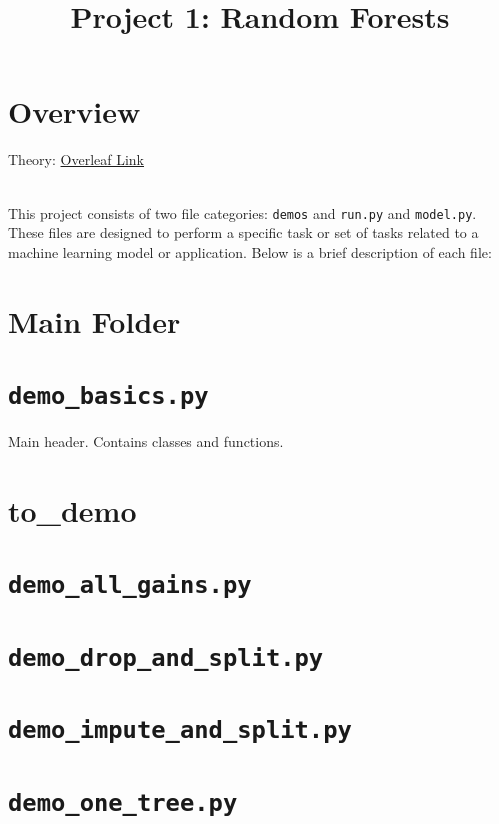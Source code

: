 \documentclass{article}
\begin{document}
\title{Project 1: Random Forests}
\author{}
\date{}
\maketitle

\section*{Overview}


Theory: \href{https://www.overleaf.com/project/65e797a9e7782c058ef218cc}{Overleaf Link}

\\
This project consists of two file categories: \texttt{demos} and \texttt{\texttt{run.py}} and \texttt{model.py}. These files are designed to perform a specific task or set of tasks related to a machine learning model or application. Below is a brief description of each file:


\section{\textbf{Main Folder}}

\section*{\texttt{demo\_basics.py}}

Main header. Contains classes and functions.

\section{\textbf{to\_demo}}

\section*{\texttt{demo\_all\_gains.py}}

\section*{\texttt{demo\_drop\_and\_split.py}}
\section*{\texttt{demo\_impute\_and\_split.py}}
\section*{\texttt{demo\_one\_tree.py}}
\end{document}
